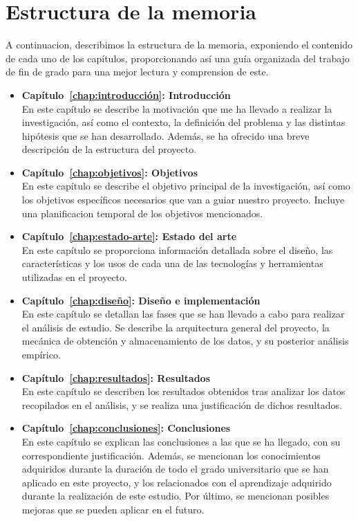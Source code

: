 \documentclass[a4paper, 12pt]{book}
\begin{document}
\section{Estructura de la memoria}
\label{sec:estructura}

A continuacion, describimos la estructura de la memoria, exponiendo el contenido de cada uno de los capítulos, proporcionando así
una guía organizada del trabajo de fin de grado para una mejor lectura y comprension de este.

\begin{itemize}
  
  \item \textbf{Capítulo~\ref{chap:introducción}: Introducción}
  \\En este capítulo se describe la motivación que me ha llevado a realizar la investigación, así
  como el contexto, la definición del problema y las distintas hipótesis que se han desarrollado. Además, se ha ofrecido una breve descripción de la estructura del proyecto.

  \item \textbf{Capítulo~\ref{chap:objetivos}: Objetivos}
  \\En este capítulo se describe el objetivo principal de la investigación, así como los objetivos específicos necesarios
  que van a guiar nuestro proyecto. Incluye una planificacion temporal de los objetivos mencionados. 
  
  \item \textbf{Capítulo~\ref{chap:estado-arte}: Estado del arte}
  \\En este capítulo se proporciona información detallada sobre el diseño, las características y los usos de cada
  una de las tecnologías y herramientas utilizadas en el proyecto.  
  
  \item \textbf{Capítulo~\ref{chap:diseño}: Diseño e implementación}
  \\En este capítulo se detallan las fases que se han llevado a cabo para realizar el análisis de estudio. 
  Se describe la arquitectura general del proyecto, la mecánica de obtención y almacenamiento de los datos, y su posterior análisis empírico.

  \item \textbf{Capítulo~\ref{chap:resultados}: Resultados}
  \\En este capítulo se describen los resultados obtenidos tras analizar los datos recopilados en el análisis, y se 
  realiza una justificación de dichos resultados.
 
  \item \textbf{Capítulo~\ref{chap:conclusiones}: Conclusiones}
  \\En este capítulo se explican las conclusiones a las que se ha llegado, con su correspondiente justificación.
  Además, se mencionan los conocimientos adquiridos durante la duración de todo el grado universitario que se han aplicado en este proyecto, y los relacionados con el aprendizaje
  adquirido durante la realización de este estudio. Por último, se mencionan posibles mejoras que se pueden aplicar en el futuro.

\end{itemize}
\end{document}
